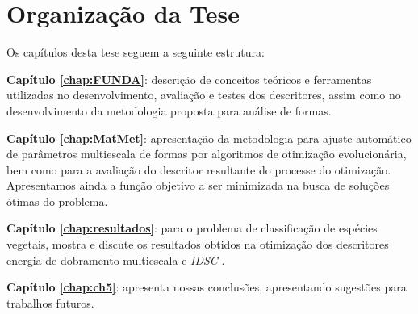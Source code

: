 \section{Organização da Tese \label{sec:org}}

Os capítulos desta tese seguem a seguinte estrutura:

\noindent \textbf{Capítulo \ref{chap:FUNDA}}:  descrição de conceitos teóricos e ferramentas utilizadas no desenvolvimento, avaliação e testes dos descritores, assim como no desenvolvimento da metodologia proposta para análise de formas.

\noindent \textbf{Capítulo \ref{chap:MatMet}}:  apresentação da metodologia para ajuste automático de parâmetros multiescala de formas por algoritmos de otimização evolucionária, bem como para a avaliação do descritor resultante do processe do otimização. Apresentamos ainda a função objetivo a ser minimizada na busca de soluções ótimas do problema.

\noindent \textbf{Capítulo \ref{chap:resultados}}: para o problema de classificação de espécies vegetais, mostra e discute os resultados obtidos na otimização dos descritores energia de dobramento multiescala e \emph{IDSC} .

\noindent \textbf{Capítulo \ref{chap:ch5}}: apresenta nossas conclusões, apresentando sugestões para trabalhos futuros. 
